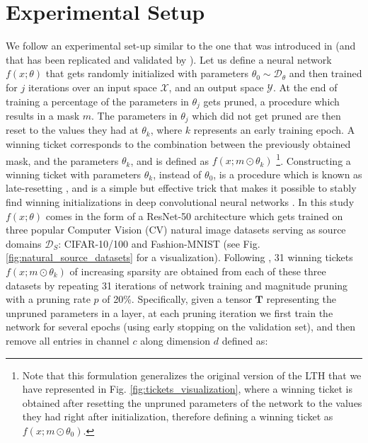 \section{Experimental Setup}
\label{sec:experimental_setup}
We follow an experimental set-up similar to the one that was introduced in \cite{morcos2019one} (and that has been replicated and validated by \citet{gohil2019one}). Let us define a neural network $f(x;\theta)$ that gets randomly initialized with parameters $\theta_0 \sim \mathscr{D}_{\theta}$ and then trained for $j$ iterations over an input space $\mathcal{X}$, and an output space $\mathcal{Y}$. At the end of training a percentage of the parameters in $\theta_j$ gets pruned, a procedure which results in a mask $m$. The parameters in $\theta_j$ which did not get pruned are then reset to the values they had at $\theta_k$, where $k$ represents an early training epoch. A winning ticket corresponds to the combination between the previously obtained mask, and the parameters $\theta_k$, and is defined as $f(x;m\odot\theta_k)$ \footnote{Note that this formulation generalizes the original version of the LTH \cite{frankle2018lottery} that we have represented in Fig. \ref{fig:tickets_visualization}, where a winning ticket is obtained after resetting the unpruned parameters of the network to the values they had right after initialization, therefore defining a winning ticket as $f(x;m\odot\theta_0)$.}. Constructing a winning ticket with parameters $\theta_k$, instead of $\theta_0$, is a procedure which is known as late-resetting \cite{franklestabilizing}, and is a simple but effective trick that makes it possible to stably find winning initializations in deep convolutional neural networks \cite{franklestabilizing,morcos2019one}. In this study $f(x;\theta)$ comes in the form of a ResNet-50 architecture \cite{han2015deep} which gets trained on three popular Computer Vision (CV) natural image datasets serving as source domains $\mathcal{D}_S$: CIFAR-10/100 and Fashion-MNIST (see Fig. \ref{fig:natural_source_datasets} for a visualization). Following \cite{han2015deep,morcos2019one}, 31 winning tickets $f(x;m\odot\theta_k)$ of increasing sparsity are obtained from each of these three datasets by repeating 31 iterations of network training and magnitude pruning with a pruning rate $p$ of 20\%. Specifically, given a tensor $\mathbf{T}$ representing the unpruned parameters in a layer, at each pruning iteration we first train the network for several epochs (using early stopping on the validation set), and then remove all entries in channel $c$ along dimension $d$ defined as:

